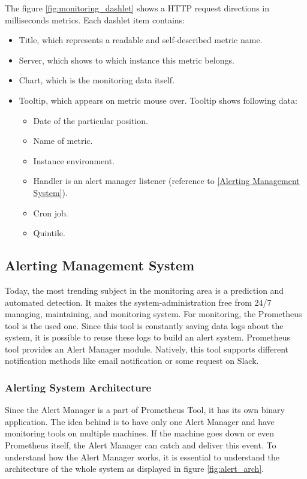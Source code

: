  
The figure \ref{fig:monitoring_dashlet}  shows a HTTP request directions in milliseconds metrics. Each dashlet item contains:
\begin{itemize}
\item Title, which represents a readable and self-described metric name.
\item Server, which shows to which instance this metric belongs.
\item Chart, which is the monitoring data itself. 
\item Tooltip, which appears on metric mouse over. Tooltip shows following data:
\begin{itemize}
\item Date of the particular position.
\item Name of metric.
\item Instance environment.
\item Handler is an alert manager listener (reference to \autoref{Alerting Management System}).
\item Cron job.
\item Quintile.
\end{itemize}

\end{itemize}


\subsection{Alerting Management System}\label{Alerting Management System}

Today, the most trending subject in the monitoring area is a prediction and automated detection. It makes the system-administration free from 24/7 managing, maintaining, and monitoring system.
For monitoring, the Prometheus tool is the used one. Since this tool is constantly saving data logs about the system, it is possible to reuse these logs to build an alert system. 
Prometheus tool provides an Alert Manager module. Natively, this tool supports different notification methods like email notification or some request on Slack. 

\subsubsection{Alerting System Architecture}\label{Alerting System Architecture}

Since the Alert Manager is a part of Prometheus Tool, it has its own binary application. The idea behind is to have only one Alert Manager and have monitoring tools on multiple machines. If the machine goes down or even Prometheus itself, the Alert Manager can catch and deliver this event. 
To understand how the Alert Manager works, it is essential to understand the architecture of the whole system as displayed in figure \ref{fig:alert_arch}.

